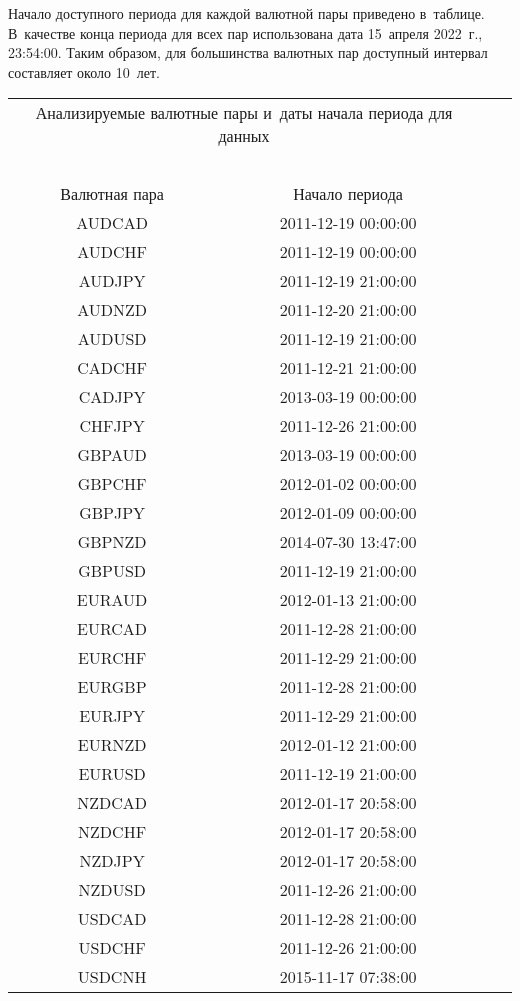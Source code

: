 {\begin{multicols}{2}
Начало доступного периода для каждой валютной пары приведено в~таблице. В~качестве 
конца периода для всех пар использована дата 15~апреля 2022~г., 23:54:00. Таким 
образом, для большинства валютных пар доступный интервал составляет около 10~лет. %



  
   \begin{center}
   \vspace*{-9pt}
   
{\small \begin{tabular}{|c|c|c|c|}
   \multicolumn{2}{p{63mm}}{Анализируемые валютные пары и~даты начала периода для данных}\\
   \multicolumn{2}{c}{\ }\\[-6pt]
   \hline
Валютная пара&Начало периода\\
\hline
AUDCAD&2011-12-19 00:00:00\\ 
AUDCHF&2011-12-19 00:00:00\\ 
AUDJPY&2011-12-19 21:00:00\\ 
AUDNZD&2011-12-20 21:00:00\\ 
AUDUSD&2011-12-19 21:00:00\\ 
CADCHF&2011-12-21 21:00:00\\ 
CADJPY&2013-03-19 00:00:00\\ 
CHFJPY&2011-12-26 21:00:00\\ 
GBPAUD&2013-03-19 00:00:00\\ 
GBPCHF&2012-01-02 00:00:00\\ 
GBPJPY&2012-01-09 00:00:00\\ 
GBPNZD&2014-07-30 13:47:00\\ 
GBPUSD&2011-12-19 21:00:00\\ 
EURAUD&2012-01-13 21:00:00\\
EURCAD&2011-12-28 21:00:00\\  
EURCHF&2011-12-29 21:00:00\\  
EURGBP&2011-12-28 21:00:00\\  
EURJPY&2011-12-29 21:00:00\\  
EURNZD&2012-01-12 21:00:00\\  
EURUSD&2011-12-19 21:00:00\\  
NZDCAD&2012-01-17 20:58:00\\  
NZDCHF&2012-01-17 20:58:00\\  
NZDJPY&2012-01-17 20:58:00\\  
NZDUSD&2011-12-26 21:00:00\\  
USDCAD&2011-12-28 21:00:00\\  
USDCHF&2011-12-26 21:00:00\\  
USDCNH&2015-11-17 07:38:00\\
\hline
  \end{tabular}
  }
\end{center}


\end{multicols}}
